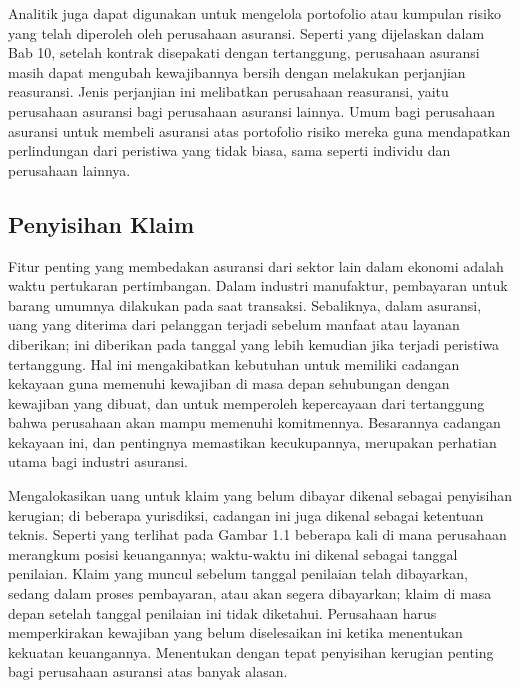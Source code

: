 \documentclass[
]{book}
\begin{document}
Analitik juga dapat digunakan untuk mengelola portofolio atau kumpulan risiko yang telah diperoleh oleh perusahaan asuransi. Seperti yang dijelaskan dalam Bab 10, setelah kontrak disepakati dengan tertanggung, perusahaan asuransi masih dapat mengubah kewajibannya bersih dengan melakukan perjanjian reasuransi. Jenis perjanjian ini melibatkan perusahaan reasuransi, yaitu perusahaan asuransi bagi perusahaan asuransi lainnya. Umum bagi perusahaan asuransi untuk membeli asuransi atas portofolio risiko mereka guna mendapatkan perlindungan dari peristiwa yang tidak biasa, sama seperti individu dan perusahaan lainnya.

\hypertarget{penyisihan-klaim}{%
\subsection{Penyisihan Klaim}\label{penyisihan-klaim}}

Fitur penting yang membedakan asuransi dari sektor lain dalam ekonomi adalah waktu pertukaran pertimbangan. Dalam industri manufaktur, pembayaran untuk barang umumnya dilakukan pada saat transaksi. Sebaliknya, dalam asuransi, uang yang diterima dari pelanggan terjadi sebelum manfaat atau layanan diberikan; ini diberikan pada tanggal yang lebih kemudian jika terjadi peristiwa tertanggung. Hal ini mengakibatkan kebutuhan untuk memiliki cadangan kekayaan guna memenuhi kewajiban di masa depan sehubungan dengan kewajiban yang dibuat, dan untuk memperoleh kepercayaan dari tertanggung bahwa perusahaan akan mampu memenuhi komitmennya. Besarannya cadangan kekayaan ini, dan pentingnya memastikan kecukupannya, merupakan perhatian utama bagi industri asuransi.

Mengalokasikan uang untuk klaim yang belum dibayar dikenal sebagai penyisihan kerugian; di beberapa yurisdiksi, cadangan ini juga dikenal sebagai ketentuan teknis. Seperti yang terlihat pada Gambar 1.1 beberapa kali di mana perusahaan merangkum posisi keuangannya; waktu-waktu ini dikenal sebagai tanggal penilaian. Klaim yang muncul sebelum tanggal penilaian telah dibayarkan, sedang dalam proses pembayaran, atau akan segera dibayarkan; klaim di masa depan setelah tanggal penilaian ini tidak diketahui. Perusahaan harus memperkirakan kewajiban yang belum diselesaikan ini ketika menentukan kekuatan keuangannya. Menentukan dengan tepat penyisihan kerugian penting bagi perusahaan asuransi atas banyak alasan.
\end{document}
